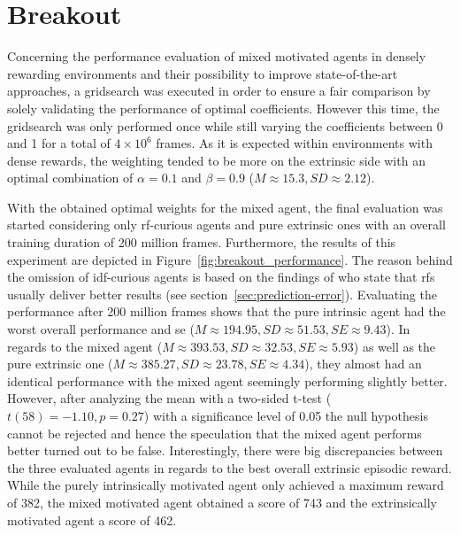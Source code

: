 \documentclass[draft,final]{vutinfth} %
\begin{document}
    \section{Breakout}

    Concerning the performance evaluation of mixed motivated agents in densely rewarding environments and their possibility to improve state-of-the-art approaches, a gridsearch was executed in order to ensure a fair comparison by solely validating the performance of optimal coefficients.
    However this time, the gridsearch was only performed once while still varying the coefficients between 0 and 1 for a total of $4\times10^6$ frames.
    As it is expected within environments with dense rewards, the weighting tended to be more on the extrinsic side with an optimal combination of $\alpha=0.1$ and $\beta=0.9$ ($M\approx15.3,SD\approx2.12$).

    With the obtained optimal weights for the mixed agent, the final evaluation was started considering only \gls{rf}-curious agents and pure extrinsic ones with an overall training duration of 200 million frames.
    Furthermore, the results of this experiment are depicted in Figure~\ref{fig:breakout_performance}.
    The reason behind the omission of \gls{idf}-curious agents is based on the findings of \citet{burda_large-scale_2018-1} who state that \glspl{rf} usually deliver better results (see section~\ref{sec:prediction-error}).
    Evaluating the performance after 200 million frames shows that the pure intrinsic agent had the worst overall performance and \gls{se} ($M\approx194.95,SD\approx51.53,SE\approx9.43$).
    In regards to the mixed agent ($M\approx393.53,SD\approx32.53,SE\approx5.93$) as well as the pure extrinsic one ($M\approx385.27,SD\approx23.78,SE\approx4.34$), they almost had an identical performance with the mixed agent seemingly performing slightly better.
    However, after analyzing the mean with a two-sided t-test ($t(58)=-1.10,p=0.27$) with a significance level of 0.05 the null hypothesis cannot be rejected and hence the speculation that the mixed agent performs better turned out to be false.
    Interestingly, there were big discrepancies between the three evaluated agents in regards to the best overall extrinsic episodic reward.
    While the purely intrinsically motivated agent only achieved a maximum reward of 382, the mixed motivated agent obtained a score of 743 and the extrinsically motivated agent a score of 462.
\end{document}
